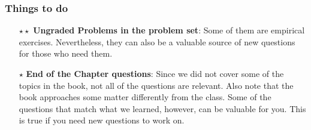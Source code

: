 \documentclass[aspectratio=169]{beamer}
\begin{document}
\begin{frame}
\frametitle{Things to do}
\begin{itemize} 
\item[$\star\star$] \textbf{Ungraded Problems in the problem set}: Some of them are empirical exercises. Nevertheless, they can also be a valuable source of new questions for those who need them. 
\item[$\star$]\textbf{End of the Chapter questions}: Since we did not cover some of the topics in the book, not all of the questions are relevant. Also note that the book approaches some matter differently from the class. Some of the questions that match what we learned, however, can be valuable for you. This is true if you need new questions to work on. 
\end{itemize}
\end{frame}
\end{document}
